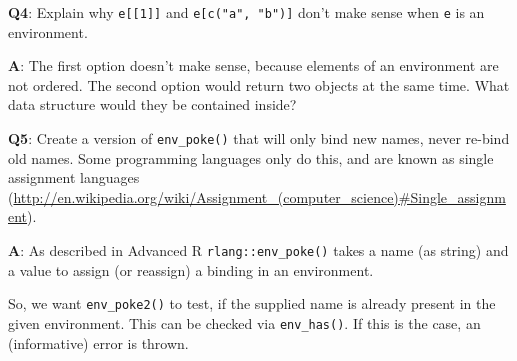 \documentclass[
]{krantz}
\makeatletter
\newenvironment{Shaded}{\begin{snugshade}}{\end{snugshade}}
\newcommand{\CharTok}[1]{\textcolor[rgb]{0.31,0.60,0.02}{#1}}
\newcommand{\CommentTok}[1]{\textcolor[rgb]{0.56,0.35,0.01}{\textit{#1}}}
\newcommand{\ControlFlowTok}[1]{\textcolor[rgb]{0.13,0.29,0.53}{\textbf{#1}}}
\newcommand{\DecValTok}[1]{\textcolor[rgb]{0.00,0.00,0.81}{#1}}
\newcommand{\KeywordTok}[1]{\textcolor[rgb]{0.13,0.29,0.53}{\textbf{#1}}}
\newcommand{\NormalTok}[1]{#1}
\newcommand{\OperatorTok}[1]{\textcolor[rgb]{0.81,0.36,0.00}{\textbf{#1}}}
\newcommand{\StringTok}[1]{\textcolor[rgb]{0.31,0.60,0.02}{#1}}
\renewcommand{\href}[2]{#2 (\url{#1})}
\newenvironment{kframe}{%
\medskip{}
\setlength{\fboxsep}{.8em}
 \def\at@end@of@kframe{}%
 \ifinner\ifhmode%
  \def\at@end@of@kframe{\end{minipage}}%
  \begin{minipage}{\columnwidth}%
 \fi\fi%
 \def\FrameCommand##1{\hskip\@totalleftmargin \hskip-\fboxsep
 \colorbox{shadecolor}{##1}\hskip-\fboxsep
     \hskip-\linewidth \hskip-\@totalleftmargin \hskip\columnwidth}%
 \MakeFramed {\advance\hsize-\width
   \@totalleftmargin\z@ \linewidth\hsize
   \@setminipage}}%
 {\par\unskip\endMakeFramed%
 \at@end@of@kframe}
\renewenvironment{Shaded}{\begin{kframe}}{\end{kframe}}
\renewcommand{\KeywordTok} [1]{\textcolor[rgb]{0.00,0.44,0.13}{{#1}}}
\renewcommand{\DecValTok}  [1]{\textcolor[rgb]{0.25,0.63,0.44}{{#1}}}
\renewcommand{\CharTok}    [1]{\textcolor[rgb]{0.25,0.44,0.63}{{#1}}}
\renewcommand{\StringTok}  [1]{\textcolor[rgb]{0.25,0.44,0.63}{{#1}}}
\renewcommand{\CommentTok} [1]{\textcolor[rgb]{0.38,0.63,0.69}{{#1}}}
\renewcommand{\NormalTok}  [1]{{#1}}
\makeatother
\begin{document}
\textbf{{Q4}}: Explain why \texttt{e{[}{[}1{]}{]}} and \texttt{e{[}c("a",\ "b"){]}} don't make sense when \texttt{e} is an environment.

\textbf{{A}}: The first option doesn't make sense, because elements of an environment are not ordered. The second option would return two objects at the same time. What data structure would they be contained inside?

\textbf{{Q5}}: Create a version of \texttt{env\_poke()} that will only bind new names, never re-bind old names. Some programming languages only do this, and are known as \href{http://en.wikipedia.org/wiki/Assignment_(computer_science)\#Single_assignment}{single assignment languages}.

\textbf{{A}}: As described in Advanced R \texttt{rlang::env\_poke()} takes a name (as string) and a value to assign (or reassign) a binding in an environment.

\begin{Shaded}
\end{Shaded}

So, we want \texttt{env\_poke2()} to test, if the supplied name is already present in the given environment. This can be checked via \texttt{env\_has()}. If this is the case, an (informative) error is thrown.

\begin{Shaded}
\end{Shaded}
\end{document}
